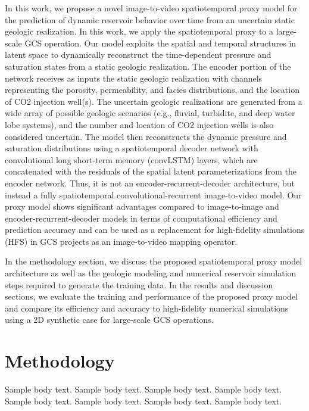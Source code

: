\documentclass[default,iicol,lineno]{sn-jnl}%
\begin{document}
In this work, we propose a novel image-to-video spatiotemporal proxy model for the prediction of dynamic reservoir behavior over time from an uncertain static geologic realization. In this work, we apply the spatiotemporal proxy to a large-scale GCS operation. Our model exploits the spatial and temporal structures in latent space to dynamically reconstruct the time-dependent pressure and saturation states from a static geologic realization. The encoder portion of the network receives as inputs the static geologic realization with channels representing the porosity, permeability, and facies distributions, and the location of CO2 injection well(s). The uncertain geologic realizations are generated from a wide array of possible geologic scenarios (e.g., fluvial, turbidite, and deep water lobe systems), and the number and location of CO2 injection wells is also considered uncertain. The model then reconstructs the dynamic pressure and saturation distributions using a spatiotemporal decoder network with convolutional long short-term memory (convLSTM) layers, which are concatenated with the residuals of the spatial latent parameterizations from the encoder network. Thus, it is not an encoder-recurrent-decoder architecture, but instead a fully spatiotemporal convolutional-recurrent image-to-video model. Our proxy model shows significant advantages compared to image-to-image and encoder-recurrent-decoder models in terms of computational efficiency and prediction accuracy and can be used as a replacement for high-fidelity simulations (HFS) in GCS projects as an image-to-video mapping operator. 

In the methodology section, we discuss the proposed spatiotemporal proxy model architecture as well as the geologic modeling and numerical reservoir simulation steps required to generate the training data. In the results and discussion sections, we evaluate the training and performance of the proposed proxy model and compare its efficiency and accuracy to high-fidelity numerical simulations using a 2D synthetic case for large-scale GCS operations. 

\section{Methodology}\label{sec2_methodology}
Sample body text. Sample body text. Sample body text. Sample body text. Sample body text. Sample body text. Sample body text. Sample body text.
\end{document}
